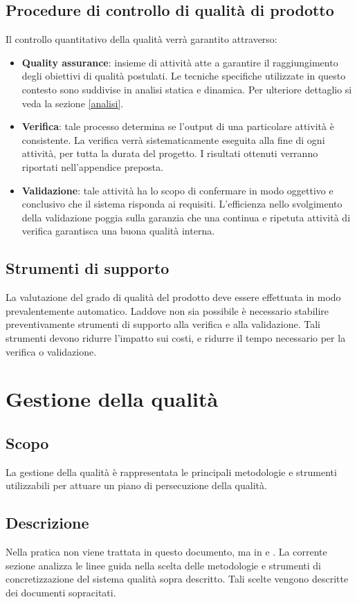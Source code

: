 \documentclass[12pt,a4paper]{article}
\begin{document}
\subsection{Procedure di controllo di qualità di prodotto}
\label{sec:procedure-di-controllo-di-qualità-di-prodotto}
Il controllo quantitativo della qualità verrà garantito attraverso:
\begin{itemize}
	\item{\textbf{Quality assurance}}: insieme di attività atte a garantire il raggiungimento degli obiettivi di qualità postulati. 
	Le tecniche specifiche utilizzate in questo contesto sono suddivise in analisi statica e dinamica. Per ulteriore dettaglio si veda la sezione \ref{analisi}.
	\item{\textbf{Verifica}}: tale processo determina se l'output di una particolare attività è consistente. La verifica verrà sistematicamente eseguita alla fine di ogni attività, per tutta la durata del progetto. I risultati ottenuti verranno riportati nell'appendice preposta.
	\item{\textbf{Validazione}}: tale attività ha lo scopo di confermare in modo oggettivo e conclusivo che il sistema risponda ai requisiti. L'efficienza nello svolgimento della validazione poggia sulla garanzia che una continua e ripetuta attività di verifica garantisca una buona qualità interna.
\end{itemize}
\subsection{Strumenti di supporto}
La valutazione del grado di qualità del prodotto deve essere effettuata in modo prevalentemente automatico. Laddove non sia possibile è necessario stabilire preventivamente strumenti di supporto alla verifica e alla validazione. Tali strumenti devono ridurre l'impatto sui costi, e ridurre il tempo necessario per la verifica o validazione. 


\section{Gestione della qualità}
\label{gest_qual}
\subsection{Scopo}
La gestione della qualità è rappresentata le principali metodologie e strumenti utilizzabili per attuare un piano di persecuzione della qualità. 

\subsection{Descrizione}
Nella pratica non viene trattata in questo documento, ma in \PdP{} e \NdP{}.
La corrente sezione analizza le linee guida nella scelta delle metodologie e strumenti di concretizzazione del sistema qualità sopra descritto. Tali scelte vengono descritte dei documenti sopracitati.
\end{document}
